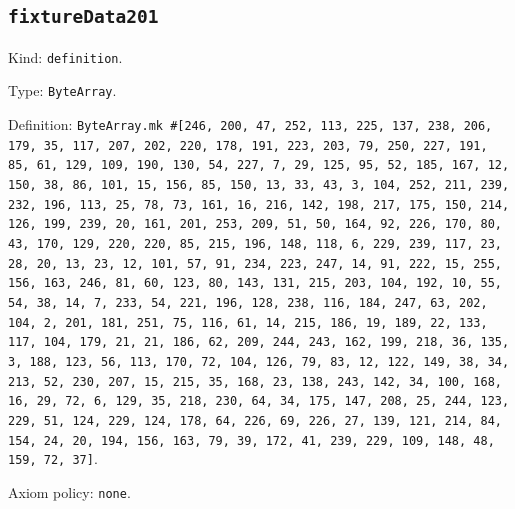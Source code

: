\documentclass[11pt]{article}
\begin{document}
\subsection*{\texttt{fixtureData201}}
\noindent Kind: \texttt{definition}.\par
\noindent Type: \texttt{ByteArray}.\par
\noindent Definition: \texttt{ByteArray.mk \#[246, 200, 47, 252, 113, 225, 137, 238, 206, 179, 35, 117, 207, 202, 220, 178, 191, 223, 203, 79, 250, 227, 191, 85, 61, 129, 109, 190, 130, 54, 227, 7, 29, 125, 95, 52, 185, 167, 12, 150, 38, 86, 101, 15, 156, 85, 150, 13, 33, 43, 3, 104, 252, 211, 239, 232, 196, 113, 25, 78, 73, 161, 16, 216, 142, 198, 217, 175, 150, 214, 126, 199, 239, 20, 161, 201, 253, 209, 51, 50, 164, 92, 226, 170, 80, 43, 170, 129, 220, 220, 85, 215, 196, 148, 118, 6, 229, 239, 117, 23, 28, 20, 13, 23, 12, 101, 57, 91, 234, 223, 247, 14, 91, 222, 15, 255, 156, 163, 246, 81, 60, 123, 80, 143, 131, 215, 203, 104, 192, 10, 55, 54, 38, 14, 7, 233, 54, 221, 196, 128, 238, 116, 184, 247, 63, 202, 104, 2, 201, 181, 251, 75, 116, 61, 14, 215, 186, 19, 189, 22, 133, 117, 104, 179, 21, 21, 186, 62, 209, 244, 243, 162, 199, 218, 36, 135, 3, 188, 123, 56, 113, 170, 72, 104, 126, 79, 83, 12, 122, 149, 38, 34, 213, 52, 230, 207, 15, 215, 35, 168, 23, 138, 243, 142, 34, 100, 168, 16, 29, 72, 6, 129, 35, 218, 230, 64, 34, 175, 147, 208, 25, 244, 123, 229, 51, 124, 229, 124, 178, 64, 226, 69, 226, 27, 139, 121, 214, 84, 154, 24, 20, 194, 156, 163, 79, 39, 172, 41, 239, 229, 109, 148, 48, 159, 72, 37]}.\par
\noindent Axiom policy: \texttt{none}.\par
\end{document}
